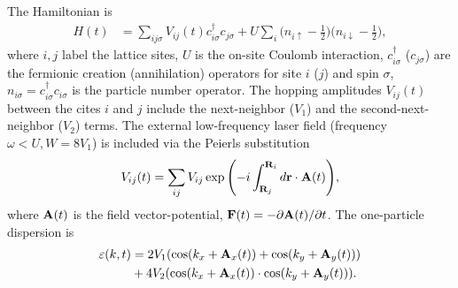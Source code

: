 \documentclass[prb,aps,twocolumn,showpacs,amsmath,amssymb]{revtex4}%
\begin{document}
The Hamiltonian is 
  \begin{align}
    \label{Ham1}
    H(t)
    &=
    \sum_{ij\sigma}
    V_{ij}(t)
    c_{i\sigma}^{\dagger}
    c_{j\sigma}
    +
    U
    \sum_{i}
    \big(n_{i\uparrow}\!-\!\tfrac12\big)
    \big(n_{i\downarrow}\!-\!\tfrac12\big)
    ,
  \end{align}
where $i, j$ label the lattice sites, 
$U$ is the on-site Coulomb interaction,
$c_{i\sigma}^{\dagger}$ ($c_{j\sigma}$) are the fermionic creation (annihilation) operators for site $i$ ($j$) and spin $\sigma$, 
$n_{i\sigma}=c_{i\sigma}^{\dagger}c_{i\sigma}$ is the 
particle number operator.
The hopping amplitudes $V_{ij}(t)$  between the 
cites $i$ and $j$ include the 
next-neighbor ($V_1$) and the second-next-neighbor ($V_2$)
terms. The external low-frequency laser field 
(frequency $\omega < U, W=8V_1$) is included
via the Peierls substitution 
  \begin{equation}
V_{ij}(t)=\sum_{ij}V_{ij}\exp{ \left( -i\int_{{\bf R}_{j}}^{{\bf R}_{i}} d{\bf r} \cdot {\bf A}(t) \right) },
\end{equation}
where ${\bf A}(t)$ is the field vector-potential,
${\bf F}(t) ={-} {\partial} {\bf A}(t) / {\partial t} $. The one-particle dispersion is
\begin{equation}
\begin{split}
  \varepsilon(k,t)&=2V_1(\cos(k_x+{\bf A}_x(t))+\cos(k_y+{\bf A}_y(t)))\\
  &+4V_2(\cos(k_x+{\bf A}_x(t))\cdot \cos(k_y+{\bf A}_y(t))).
\end{split}
\label{dispersion}
\end{equation}
\end{document}
